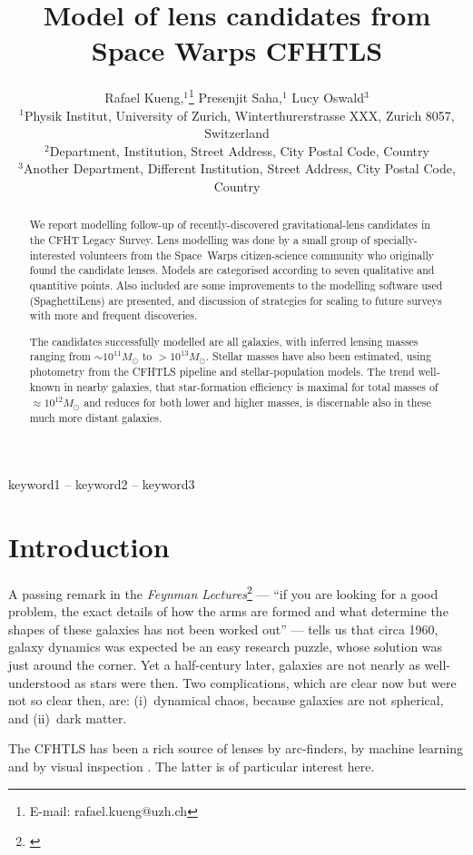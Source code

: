 \documentclass[fleqn,usenatbib]{mnras}
\title[Short title, max. 45 characters]{Model of lens candidates from
  Space Warps CFHTLS}
\author[R. Kueng et al.]{
Rafael Kueng,$^{1}$\thanks{E-mail: rafael.kueng@uzh.ch}
Presenjit Saha,$^{1}$
Lucy Oswald$^{3}$
\\
$^{1}$Physik Institut, University of Zurich, Winterthurerstrasse XXX, Zurich 8057, Switzerland\\
$^{2}$Department, Institution, Street Address, City Postal Code, Country\\
$^{3}$Another Department, Different Institution, Street Address, City Postal Code, Country
}
\begin{document}
\label{firstpage}
\pagerange{\pageref{firstpage}--\pageref{lastpage}}
\maketitle

\begin{abstract}
We report modelling follow-up of recently-discovered
gravitational-lens candidates in the CFHT Legacy Survey.  Lens
modelling was done by a small group of specially-interested volunteers
from the Space~Warps citizen-science community who originally found
the candidate lenses.  Models are categorised according to seven
qualitative and quantitive points.  Also included are some
improvements to the modelling software used (SpaghettiLens) are
presented, and discussion of strategies for scaling to future surveys
with more and frequent discoveries.

The candidates successfully modelled are all galaxies, with inferred
lensing masses ranging from $\sim10^{11}M_\odot$ to $>10^{13}M_\odot$.
Stellar masses have also been estimated, using photometry from the
CFHTLS pipeline and stellar-population models.  The trend well-known
in nearby galaxies, that star-formation efficiency is maximal for
total masses of $\approx10^{12}M_\odot$ and reduces for both lower and
higher masses, is discernable also in these much more distant
galaxies.
\end{abstract}

\begin{keywords}
keyword1 -- keyword2 -- keyword3
\end{keywords}

\section{Introduction}

A passing remark in the {\em Feynman Lectures}\footnote{
  \cite{1963flp..book.....F}} --- ``if you are looking for a good
problem, the exact details of how the arms are formed and what
determine the shapes of these galaxies has not been worked out'' ---
tells us that circa 1960, galaxy dynamics was expected be an easy
research puzzle, whose solution was just around the corner.  Yet a
half-century later, galaxies are not nearly as well-understood as
stars were then.  Two complications, which are clear now but were not
so clear then, are: (i)~dynamical chaos, because galaxies are not
spherical, and (ii)~dark matter.

The CFHTLS \citep{2012SPIE.8448E..0MC} has been a rich source of
lenses by arc-finders, by machine learning \citep{2016arXiv160504309P}
and by visual inspection \citep{2016MNRAS.455.1171M}.  The latter is
of particular interest here.
\end{document}
